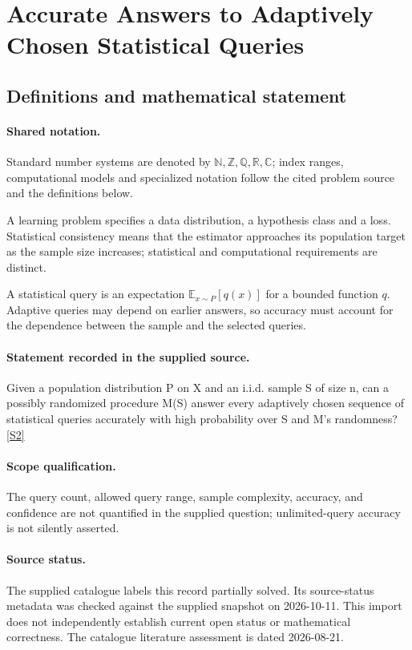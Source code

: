\documentclass[11pt]{article}
\newcommand{\sref}[2]{\hyperlink{source:#1:#2}{[S#2]}}
\begin{document}
\section{Accurate Answers to Adaptively Chosen Statistical Queries}\label{statement}

\subsection{Definitions and mathematical statement}

\paragraph{Shared notation.}Standard number systems are denoted by $\mathbb N,\mathbb Z,\mathbb Q,\mathbb R,\mathbb C$; index ranges, computational models and specialized notation follow the cited problem source and the definitions below.


A learning problem specifies a data distribution, a hypothesis class and a loss. Statistical consistency means that the estimator approaches its population target as the sample size increases; statistical and computational requirements are distinct.

A statistical query is an expectation $\mathbb E_{x\sim P}[q(x)]$ for a bounded function $q$. Adaptive queries may depend on earlier answers, so accuracy must account for the dependence between the sample and the selected queries.
\paragraph{Statement recorded in the supplied source.}
Given a population distribution P on X and an i.i.d. sample S of size n, can a possibly randomized procedure M(S) answer every adaptively chosen sequence of statistical queries accurately with high probability over S and M's randomness? \sref{statement}{2}
\paragraph{Scope qualification.}
The query count, allowed query range, sample complexity, accuracy, and confidence are not quantified in the supplied question; unlimited-query accuracy is not silently asserted.
\paragraph{Source status.}
The supplied catalogue labels this record partially solved. Its source-status metadata was checked against the supplied snapshot on 2026-10-11. This import does not independently establish current open status or mathematical correctness. The catalogue literature assessment is dated 2026-08-21.
\end{document}
